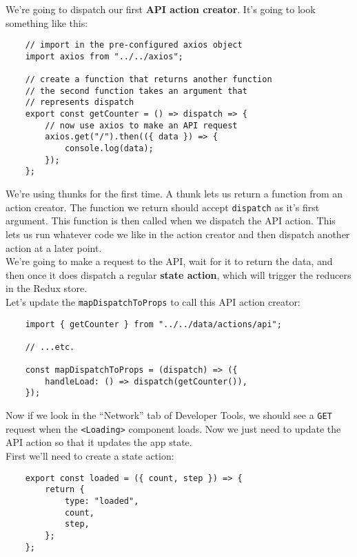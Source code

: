 We're going to dispatch our first \textbf{API action creator}. It's going to look something like this:

\begin{verbatim}
    // import in the pre-configured axios object
    import axios from "../../axios";

    // create a function that returns another function
    // the second function takes an argument that
    // represents dispatch
    export const getCounter = () => dispatch => {
        // now use axios to make an API request
        axios.get("/").then(({ data }) => {
            console.log(data);
        });
    };
\end{verbatim}

We're using thunks for the first time. A thunk lets us return a function from an action creator. The function we return should accept \texttt{dispatch} as it's first argument. This function is then called when we dispatch the API action. This lets us run whatever code we like in the action creator and then dispatch another action at a later point.
\\

We're going to make a request to the API, wait for it to return the data, and then once it does dispatch a regular \textbf{state action}, which will trigger the reducers in the Redux store.
\\

Let's update the \texttt{mapDispatchToProps} to call this API action creator:

\begin{verbatim}
    import { getCounter } from "../../data/actions/api";

    // ...etc.

    const mapDispatchToProps = (dispatch) => ({
        handleLoad: () => dispatch(getCounter()),
    });
\end{verbatim}

Now if we look in the ``Network'' tab of Developer Tools, we should see a \texttt{GET} request when the \texttt{<Loading>} component loads. Now we just need to update the API action so that it updates the app state.
\\

First we'll need to create a state action:

\begin{verbatim}
    export const loaded = ({ count, step }) => {
        return {
            type: "loaded",
            count,
            step,
        };
    };
\end{verbatim}

